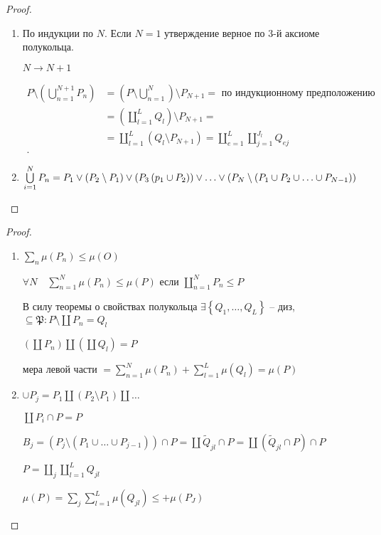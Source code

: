 \documentclass{book}
\newcommand{\tl}[1]{\widetilde{#1}}
\theoremstyle{definition}
\begin{document}
\begin{proof}
    \begin{enumerate}
        \item  По индукции по $N$. Если  $N=1$ утверждение верное по 3-й аксиоме полукольца.

             $N \to N+1$

            \begin{align*}
                P \setminus \left( \bigcup\limits_{n=1}^{N+1}P_n  \right)  &= \left( P \setminus \bigcup\limits_{n=1}^{N}  \right) \setminus P_{N+1} = \text{ по индукционному предположению}\\
                &=\left( \coprod_{l=1}^L Q_l \right) \setminus P_{N+1} = \\
                &= \coprod_{l=1} ^L\left( Q_l \setminus  P_{N+1} \right)  = \coprod_{e=1}^L \coprod_{j=1}^{J_l} Q_{ej}\\
            .\end{align*}               
        \item $\bigcup\limits_{i=1} ^N P_n = P_1 \vee \left( P_2\setminus P_1 \right) \vee \left( P_3 \\ \left( p_1 \cup P_2 \right)  \right) \vee \ldots \vee \left( P_N \setminus  \left( P_1 \cup P_2 \cup  \ldots \cup  P_{N-1} \right)  \right) $
    \end{enumerate}
\end{proof}
\begin{proof}
    \begin{enumerate}
        \item 
    $\sum_n\mu(P_n) \leqslant \mu(O)$

    $\forall N\quad \sum_{n=1}^{N} \mu(P_n) \leqslant \mu(P)$ если $\coprod_{n=1}^N P_n \leqslant  P$

    В силу теоремы о свойствах полукольца $\exists \left\{ Q_1, \ldots, Q_L \right\} $ -- диз, $\subseteq \mathfrak P: P\setminus \coprod P_n = Q_l$

    $\left(\coprod P_n\right) \coprod \left( \coprod Q_l \right)  = P$

    мера левой части $= \sum_{n=1}^{N} \mu(P_n) + \sum_{l=1}^{L} \mu(Q_l) = \mu(P)$
\item $\cup P_j = P_1 \coprod \left( P_2 \setminus  P_1 \right) \coprod \ldots$

    $\coprod P_i \cap P = P$

    $B_j = \left( P_j \setminus  \left( P_1 \cup \ldots \cup  P_{j-1} \right)  \right) \cap P = \coprod \tl Q_{jl} \cap P = \coprod \left( \tl Q_{jl}\cap P \right) \cap P$

    $P = \coprod_j \coprod _{l=1}^L Q_{jl}$

    $\mu(P) =\sum_j\sum_{l=1}^L \mu(Q_{jl}) \leqslant +\mu(P_J)$
    \end{enumerate}
\end{proof}
\end{document}
